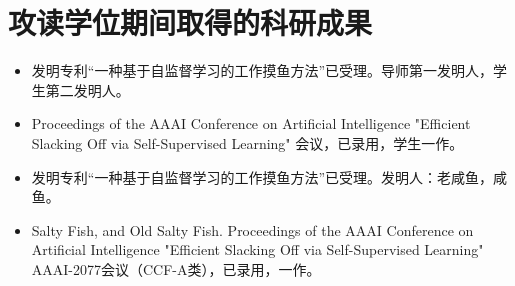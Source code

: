 
\chapter{攻读学位期间取得的科研成果}
\label{cha:achievements}

\ifanon

\begin{itemize}
  \item 发明专利“一种基于自监督学习的工作摸鱼方法”已受理。导师第一发明人，学生第二发明人。
  \item Proceedings of the AAAI Conference on Artificial Intelligence "Efficient Slacking Off via Self-Supervised Learning" 会议，已录用，学生一作。
\end{itemize}

\else

\begin{itemize}
  \item 发明专利“一种基于自监督学习的工作摸鱼方法”已受理。发明人：老咸鱼，咸鱼。
  \item Salty Fish, and Old Salty Fish. Proceedings of the AAAI Conference on Artificial Intelligence "Efficient Slacking Off via Self-Supervised Learning" AAAI-2077会议（CCF-A类），已录用，一作。
\end{itemize}

\fi

